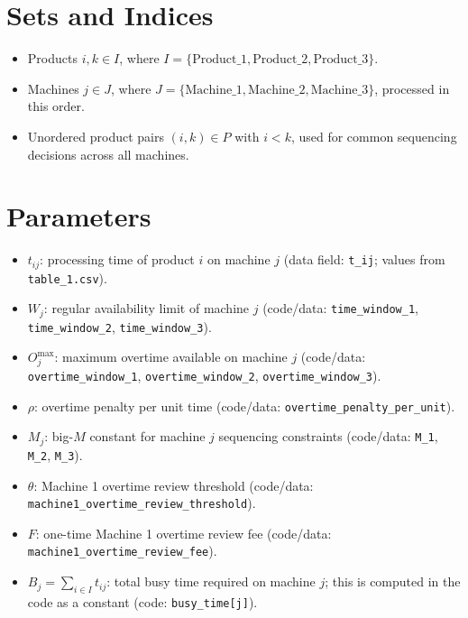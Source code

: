 \section*{Sets and Indices}

\begin{itemize}
    \item Products \(i,k \in I\), where \(I=\{\text{Product\_1},\text{Product\_2},\text{Product\_3}\}\).
    \item Machines \(j \in J\), where \(J=\{\text{Machine\_1},\text{Machine\_2},\text{Machine\_3}\}\), processed in this order.
    \item Unordered product pairs \((i,k)\in P\) with \(i<k\), used for common sequencing decisions across all machines.
\end{itemize}

\section*{Parameters}

\begin{itemize}
    \item \(t_{ij}\): processing time of product \(i\) on machine \(j\) (data field: \texttt{t\_ij}; values from \texttt{table\_1.csv}).
    \item \(W_j\): regular availability limit of machine \(j\) (code/data: \texttt{time\_window\_1}, \texttt{time\_window\_2}, \texttt{time\_window\_3}).
    \item \(O_j^{\max}\): maximum overtime available on machine \(j\) (code/data: \texttt{overtime\_window\_1}, \texttt{overtime\_window\_2}, \texttt{overtime\_window\_3}).
    \item \(\rho\): overtime penalty per unit time (code/data: \texttt{overtime\_penalty\_per\_unit}).
    \item \(M_j\): big-\(M\) constant for machine \(j\) sequencing constraints (code/data: \texttt{M\_1}, \texttt{M\_2}, \texttt{M\_3}).
    \item \(\theta\): Machine 1 overtime review threshold (code/data: \texttt{machine1\_overtime\_review\_threshold}).
    \item \(F\): one-time Machine 1 overtime review fee (code/data: \texttt{machine1\_overtime\_review\_fee}).
    \item \(B_j=\sum_{i\in I} t_{ij}\): total busy time required on machine \(j\); this is computed in the code as a constant (code: \texttt{busy\_time[j]}).
\end{itemize}

